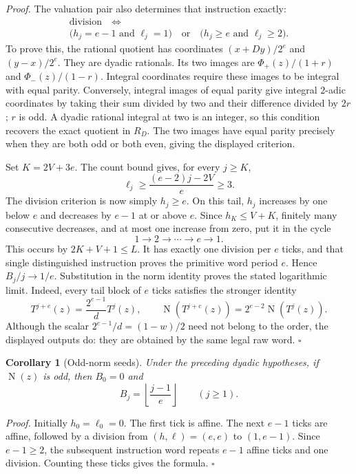\documentclass[11pt,letterpaper]{article}
\newtheorem{corollary}[theorem]{Corollary}
\newenvironment{proof}{\noindent\textit{Proof.}}{\hfill\(\square\)}
\newcommand{\OrderNorm}{\operatorname{N}}
\newcommand{\RawMap}{T}
\begin{document}
\begin{proof}
The valuation pair also determines that instruction exactly:
\[
\begin{gathered}
\text{division}\quad\Longleftrightarrow\\
\bigl(h_j=e-1\text{ and }\ell_j=1\bigr)
\quad\text{or}\quad
\bigl(h_j\ge e\text{ and }\ell_j\ge2\bigr).
\end{gathered}
\]
To prove this, the rational quotient has coordinates
\((x+Dy)/2^e\) and \((y-x)/2^e\). They are dyadic rationals.
Its two images are \(\Phi_+(z)/(1+r)\) and
\(\Phi_-(z)/(1-r)\). Integral coordinates require these images
to be integral with equal parity. Conversely, integral images of
equal parity give integral \(2\)-adic coordinates by taking their
sum divided by two and their difference divided by \(2r\);
\(r\) is odd. A dyadic rational integral at two is an integer, so
this condition recovers the exact quotient in \(R_D\).
The two images have equal parity precisely when they are both odd
or both even, giving the displayed criterion.

Set \(K=2V+3e\). The count bound gives, for every \(j\ge K\),
\[
\ell_j\ge\frac{(e-2)j-2V}{e}\ge3.
\]
The division criterion is now simply \(h_j\ge e\). On this tail,
\(h_j\) increases by one below \(e\) and decreases by \(e-1\)
at or above \(e\). Since \(h_K\le V+K\), finitely many consecutive
decreases, and at most one increase from zero, put it in the cycle
\[
1\longrightarrow2\longrightarrow\cdots\longrightarrow e
\longrightarrow1.
\]
This occurs by \(2K+V+1\le L\). It has exactly one division per
\(e\) ticks, and that single distinguished instruction proves the
primitive word period \(e\). Hence \(B_j/j\to1/e\).
Substitution in the norm identity proves the stated logarithmic limit.
Indeed, every tail block of \(e\) ticks satisfies the stronger identity
\[
\RawMap^{j+e}(z)=\frac{2^{e-1}}d\RawMap^j(z),\qquad
\OrderNorm(\RawMap^{j+e}(z))=2^{e-2}\OrderNorm(\RawMap^j(z)).
\]
Although the scalar \(2^{e-1}/d=(1-w)/2\) need not belong to the order,
the displayed outputs do: they are obtained by the same legal raw word.
\end{proof}

\begin{corollary}[Odd-norm seeds]
Under the preceding dyadic hypotheses, if \(\OrderNorm(z)\) is odd,
then \(B_0=0\) and
\[
B_j=\left\lfloor\frac{j-1}{e}\right\rfloor\qquad(j\ge1).
\]
\end{corollary}
\begin{proof}
Initially \(h_0=\ell_0=0\). The first tick is affine.
The next \(e-1\) ticks are affine, followed by a division from
\((h,\ell)=(e,e)\) to \((1,e-1)\).
Since \(e-1\ge2\), the subsequent instruction word repeats
\(e-1\) affine ticks and one division. Counting these ticks gives the formula.
\end{proof}
\end{document}
